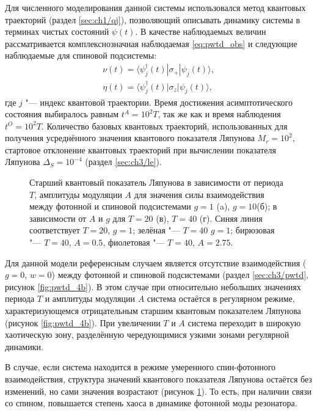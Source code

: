 Для численного моделирования данной системы использовался метод квантовых траекторий (раздел \cref{sec:ch1/qj}), позволяющий описывать динамику системы в терминах чистых состояний $\psi(t)$.
В качестве наблюдаемых величин рассматривается комплекснозначная наблюдаемая \cref{eq:pwtd_obs} и следующие наблюдаемые для спиновой подсистемы:
\begin{equation}
	\label{eq:csp_eta_nu}
	\begin{gathered}
		\nu(t) = \langle\psi^{\dagger}_{j}(t)| \sigma_+ |\psi_j(t)\rangle,\\
		\eta(t) = \langle\psi^{\dagger}_{j}(t)| \sigma_z |\psi_j(t)\rangle,
	\end{gathered}
\end{equation}
где $j$ "--- индекс квантовой траектории. Время достижения асимптотического состояния выбиралось равным \(t^A = 10^2 T\), так же как и время наблюдения \(t^O = 10^2 T\). Количество базовых квантовых траекторий, использованных для получения усреднённого значения квантового показателя Ляпунова $M_r=10^2$, стартовое отклонение квантовых траекторий при вычислении показателя Ляпунова $\Delta_S = 10^{-4}$ (раздел \cref{sec:ch3/le}).

\begin{figure}[h]
	\caption[Старший квантовый показатель Ляпунова в зависимости от периода, амплитуды модуляции и силы взаимодействия между фотонной и спиновой подсистемами.]{
		Старший квантовый показатель Ляпунова в зависимости от периода $T$, амплитуды модуляции $A$ для значения силы взаимодействия между фотонной и спиновой подсистемами $g=1$ (a), $g=10$(б); в зависимости от $A$ и $g$ для $T=20$ (в), $T=40$ (г). Синяя линия соответствует $T=20$, $g=1$; зелёная "--- $T=40$ $g=1$; бирюзовая "--- $T=40$, $A=0.5$, фиолетовая "---  $T=40$, $A=2.75$.
	}
	\label{fig:csp_1}
\end{figure}

Для данной модели референсным случаем является отсутствие взаимодействия ($g=0$, $w=0$) между фотонной и спиновой подсистемами (раздел \cref{sec:ch3/pwtd}, рисунок \cref{fig:pwtd_4b}). В этом случае при относительно небольших значениях периода $T$ и амплитуды модуляции $A$ система остаётся в регулярном режиме, характеризующемся отрицательным старшим квантовым показателем Ляпунова (рисунок \cref{fig:pwtd_4b}).
При увеличении $T$ и $A$ система переходит в широкую хаотическую зону, разделённую чередующимися узкими зонами регулярной динамики.

В случае, если система находится в режиме умеренного спин-фотонного взаимодействия, структура значений квантового показателя Ляпунова остаётся без изменений, но сами значения возрастают (рисунок \cref{fig:csp_1}). То есть, при наличии связи со спином, повышается степень хаоса в динамике фотонной моды резонатора.

